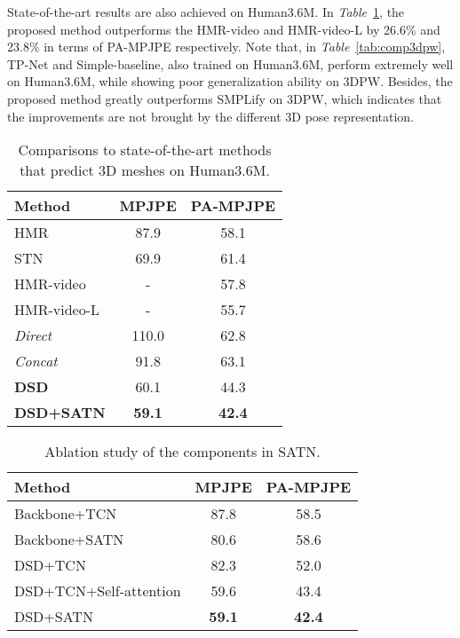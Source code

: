 \documentclass[10pt,twocolumn,letterpaper]{article}
\begin{document}
State-of-the-art results are also achieved on Human3.6M. In \textit{Table}~\ref{tab:h36mcomp1}, the proposed method outperforms the HMR-video and HMR-video-L by 26.6\% and 23.8\% in terms of PA-MPJPE respectively. Note that, in \textit{Table}~\ref{tab:comp3dpw}, TP-Net and Simple-baseline, also trained on Human3.6M, perform extremely well on Human3.6M, while showing poor generalization ability on 3DPW. Besides, the proposed method greatly outperforms SMPLify on 3DPW, which indicates that the improvements are not brought by the different 3D pose representation.

\begin{table}
  \begin{center}
  \begin{tabular}{lcc}
  \hline
Method & MPJPE &  PA-MPJPE  \\\hline
  HMR~\cite{hmr} & 87.9 & 58.1\\
  STN~\cite{yoshiyasu2018skeleton} & 69.9 & 61.4\\
  HMR-video & - & 57.8\\
  HMR-video-L & - & 55.7\\
  \textit{Direct} & 110.0 & 62.8\\
  \textit{Concat} & 91.8 & 63.1\\
\textbf{DSD} & 60.1 & 44.3 \\\textbf{DSD+SATN} & \textbf{59.1} & \textbf{42.4}\\
\hline
  \end{tabular}
  \end{center}
  \caption{Comparisons to state-of-the-art methods that predict 3D meshes on Human3.6M. }
  \label{tab:h36mcomp1}
\end{table}

\begin{table}
  \begin{center}
  \begin{tabular}{lcc}
  \hline
  Method & MPJPE &  PA-MPJPE \\
  \hline
  Backbone+TCN & 87.8 & 58.5\\
  Backbone+SATN & 80.6 & 58.6 \\
  DSD+TCN & 82.3 & 52.0 \\
  DSD+TCN+Self-attention & 59.6 & 43.4 \\ DSD+SATN & \textbf{59.1} & \textbf{42.4} \\
  \hline
  \end{tabular}
  \end{center}
  \caption{Ablation study of the components in SATN.}
  \label{tab:ablationstudy}
\end{table}
\end{document}
